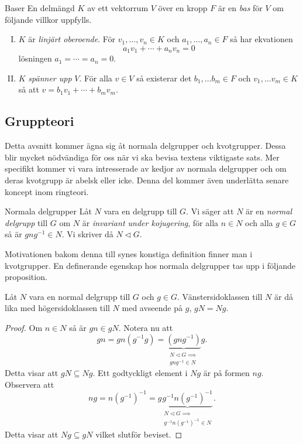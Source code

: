 \documentclass{article}
\theoremstyle{definition}
\begin{document}
\begin{mydef}{Baser}{}
  En delmängd $K$ av ett vektorrum $V$ över en kropp $F$ är en \textit{bas} för $V$ om följande villkor uppfylls.  
  \begin{enumerate}[I)]
    \item $K$ är \textit{linjärt oberoende}. För $v_1, \ldots, v_n \in K$ och $a_1, \ldots, a_n \in F$ så har ekvationen 
    \[a_1v_1 + \cdots + a_n v_n = 0\]
    lösningen $a_1 = \cdots = a_n = 0$.
    \item $K$ \textit{spänner upp} $V$. För alla $v \in V$ så existerar det $b_1, \ldots b_m \in F$ och $v_1, \ldots v_m \in K$ så att 
    $v = b_1 v_1 + \cdots + b_m v_m$.
  \end{enumerate}
\end{mydef}

\subsection{Gruppteori}
Detta avsnitt kommer ägna sig åt normala delgrupper och kvotgrupper. Dessa blir mycket nödvändiga för oss när vi ska bevisa textens viktigaste sats. 
Mer specifikt kommer vi vara intresserade av kedjor av normala delgrupper och om deras kvotgrupp är abelsk eller icke. Denna 
del kommer även underlätta senare koncept inom ringteori.

\begin{mydef}{Normala delgrupper}{}
  Låt $N$ vara en delgrupp till $G$. Vi säger att $N$ är 
  en \textit{normal delgrupp} till $G$ om $N$ är 
  \textit{invariant under kojugering}, för alla $n \in N$ och 
  alla $g \in G$ så är $gng^{-1} \in N$. Vi skriver då $N \triangleleft G.$
\end{mydef}
Motivationen bakom denna till synes konstiga definition finner man i kvotgrupper. 
En definerande egenskap hos normala delgrupper tas upp i följande proposition.

\hypertarget{prop1}{}
\begin{myprop}{}{}
  Låt $N$ vara en normal delgrupp till $G$ och $g \in G$. Vänstersidoklassen till $N$ är då lika med högersidoklassen till $N$ med avseende på $g$, 
  $gN = Ng.$
\end{myprop}
\begin{proof}
  Om $n \in N$ så är $gn \in gN$. Notera nu att 
  \begin{equation*}
    gn = gn(g^{-1}g) = \underbrace{(gng^{-1})}_{ \substack{N \triangleleft G  \implies \\ gng^{-1} \in N}} g.
  \end{equation*}
  Detta visar att $gN \subseteq Ng.$ Ett godtyckligt element i $Ng$ är på formen $ng$. Observera att 
  \begin{equation*}
    ng = n(g^{-1})^{-1} = g \underbrace{g^{-1} {n(g^{-1})^{-1}}}_{\substack{N \triangleleft G  \implies \\ g^{-1} {n(g^{-1})^{-1} \in N}}}.
  \end{equation*}
  Detta visar att $Ng \subseteq gN$ vilket slutför beviset.
\end{proof}
\end{document}
